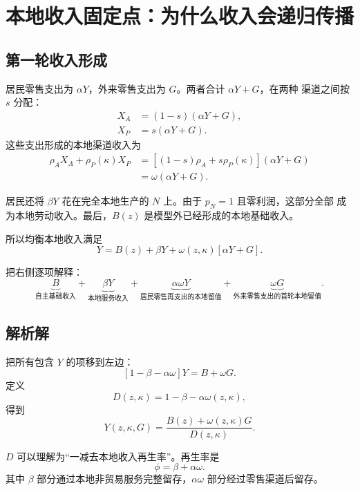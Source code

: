 \documentclass[UTF8,11pt,scheme=chinese,fontset=fandol]{ctexart}
\theoremstyle{definition}
\begin{document}
\section{本地收入固定点：为什么收入会递归传播}

\subsection{第一轮收入形成}

居民零售支出为 \(\alpha Y\)，外来零售支出为 \(G\)。两者合计 \(\alpha Y+G\)，在两种
渠道之间按 \(s\) 分配：
\begin{align}
X_A&=(1-s)(\alpha Y+G),\\
X_P&=s(\alpha Y+G).
\end{align}
这些支出形成的本地渠道收入为
\begin{align}
\rho_AX_A+\rho_P(\kappa)X_P
&=\left[(1-s)\rho_A+s\rho_P(\kappa)\right](\alpha Y+G)\\
&=\omega(\alpha Y+G).
\end{align}

居民还将 \(\beta Y\) 花在完全本地生产的 \(N\) 上。由于 \(p_N=1\) 且零利润，这部分全部
成为本地劳动收入。最后，\(B(z)\) 是模型外已经形成的本地基础收入。

所以均衡本地收入满足
\begin{equation}
Y=B(z)+\beta Y+\omega(z,\kappa)[\alpha Y+G].
\label{teach:eq:fixed-point}
\end{equation}

把右侧逐项解释：
\[
\underbrace{B}_{\text{自主基础收入}}
+\underbrace{\beta Y}_{\text{本地服务收入}}
+\underbrace{\alpha\omega Y}_{\text{居民零售再支出的本地留值}}
+\underbrace{\omega G}_{\text{外来零售支出的首轮本地留值}}.
\]

\subsection{解析解}

把所有包含 \(Y\) 的项移到左边：
\[
[1-\beta-\alpha\omega]Y=B+\omega G.
\]
定义
\begin{equation}
D(z,\kappa)=1-\beta-\alpha\omega(z,\kappa),
\label{teach:eq:D}
\end{equation}
得到
\begin{equation}
\boxed{
Y(z,\kappa,G)=\frac{B(z)+\omega(z,\kappa)G}{D(z,\kappa)}.}
\label{teach:eq:Y-solution}
\end{equation}

\(D\) 可以理解为“一减去本地收入再生率”。再生率是
\[
\phi=\beta+\alpha\omega.
\]
其中 \(\beta\) 部分通过本地非贸易服务完整留存，\(\alpha\omega\) 部分经过零售渠道后留存。
\end{document}
